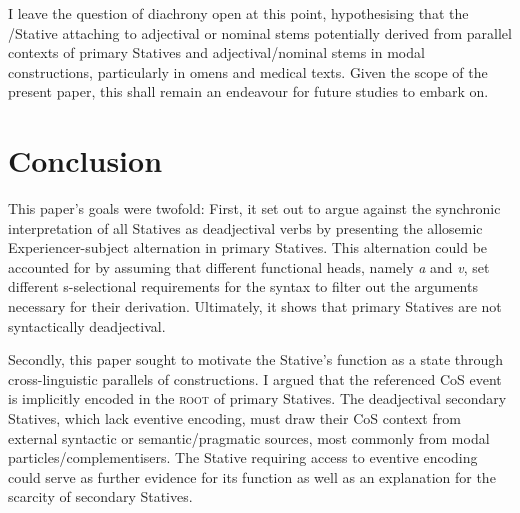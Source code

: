\documentclass[output=paper,colorlinks,citecolor=brown]{langscibook}
\begin{document}
\begin{table}

\end{table}
    

 I leave the question of diachrony open at this point, hypothesising that the /Stative attaching to adjectival or nominal stems potentially derived from parallel contexts of primary Statives and adjectival/nominal stems in modal constructions, particularly in omens and medical texts. Given the scope of the present paper, this shall remain an endeavour for future studies to embark on.



\section{Conclusion}\label{sec:Akkconclusion}

This paper's goals were twofold: First, it set out to argue against the synchronic interpretation of all Statives as deadjectival verbs by presenting the allosemic Experiencer-subject alternation in primary Statives.  This alternation could be accounted for by assuming that different functional heads, namely \textit{a} and \textit{v}, set different s-selectional requirements for the syntax to filter out the arguments necessary for their derivation. Ultimately, it shows that primary Statives are not syntactically deadjectival.

Secondly, this paper sought to motivate the Stative's function as a  state through cross-linguistic parallels of  constructions. I argued that the referenced CoS  event is implicitly encoded in the \textsc{root} of primary Statives. The deadjectival secondary Statives, which lack eventive encoding, must draw their CoS  context from external syntactic or semantic/pragmatic sources, most commonly from modal particles/complementisers. The Stative requiring access to eventive encoding could serve as further evidence for its  function as well as an explanation for the scarcity of secondary Statives.
\end{document}
